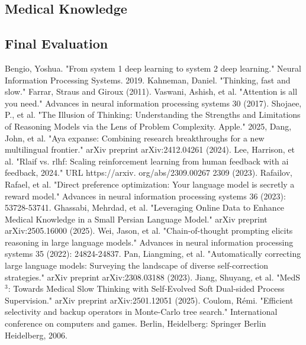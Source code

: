 \documentclass[conference]{IEEEtran}
\begin{document}
           \subsection{Medical Knowledge}
           \subsection{Final Evaluation}
	
	
	\begin{thebibliography}{00}
                Bengio, Yoshua. "From system 1 deep learning to system 2 deep learning." Neural Information Processing Systems. 2019. 
               Kahneman, Daniel. "Thinking, fast and slow." Farrar, Straus and Giroux (2011).
		Vaswani, Ashish, et al. "Attention is all you need." Advances in neural information processing systems 30 (2017).
		Shojaee, P., et al. "The Illusion of Thinking: Understanding the Strengths and Limitations of Reasoning Models via the Lens of Problem Complexity. Apple." 2025,
               Dang, John, et al. "Aya expanse: Combining research breakthroughs for a new multilingual frontier." arXiv preprint arXiv:2412.04261 (2024).
              Lee, Harrison, et al. "Rlaif vs. rlhf: Scaling reinforcement learning from human feedback with ai feedback, 2024." URL https://arxiv. org/abs/2309.00267 2309 (2023).
              Rafailov, Rafael, et al. "Direct preference optimization: Your language model is secretly a reward model." Advances in neural information processing systems 36 (2023): 53728-53741.
             Ghassabi, Mehrdad, et al. "Leveraging Online Data to Enhance Medical Knowledge in a Small Persian Language Model." arXiv preprint arXiv:2505.16000 (2025).
             Wei, Jason, et al. "Chain-of-thought prompting elicits reasoning in large language models." Advances in neural information processing systems 35 (2022): 24824-24837.
             Pan, Liangming, et al. "Automatically correcting large language models: Surveying the landscape of diverse self-correction strategies." arXiv preprint arXiv:2308.03188 (2023).
             Jiang, Shuyang, et al. "MedS$^ 3$: Towards Medical Slow Thinking with Self-Evolved Soft Dual-sided Process Supervision." arXiv preprint arXiv:2501.12051 (2025).
             Coulom, Rémi. "Efficient selectivity and backup operators in Monte-Carlo tree search." International conference on computers and games. Berlin, Heidelberg: Springer Berlin Heidelberg, 2006.

\end{thebibliography}
\end{document}
